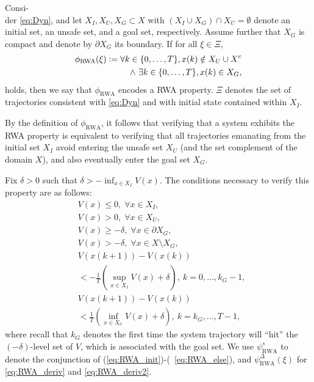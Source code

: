 \begin{property}\label{prop:rwa}
     Consi-\\der \eqref{eq:Dyn}, and let $X_I, X_U, X_G \subset X$ with $(X_I \cup X_G) \cap X_U = \emptyset$ denote an initial set, an unsafe set, and a goal set, respectively.
     Assume further that $X_G$ is compact and denote by $\partial X_G$ its boundary. 
     If for all $\xi \in \Xi$,
   \begin{equation*}
    \begin{aligned}
                \phi_\mathrm{RWA}(\xi) \vcentcolon= \forall k \in \{0,\dots,T\}, x(k) \notin X_U \cup X^c  \\ \wedge~\exists k \in \{0, \dots, T\}, x(k) \in X_G,
    \end{aligned}
    \end{equation*}
    holds, then we say that $\phi_\mathrm{RWA}$ encodes a RWA property.
    $\Xi$ denotes the set of trajectories consistent with \eqref{eq:Dyn} and with initial state contained within $X_I$.
\end{property}
By the definition of $\phi_\mathrm{RWA}$, it follows that verifying that a system exhibits the RWA property is equivalent to verifying that all trajectories emanating from the initial set $X_I$ avoid entering the unsafe set $X_U$ (and the set complement of the domain $X$), and also eventually enter the goal set $X_G$.

Fix $\delta>0$ such that $\delta > -\inf_{x \in X_I} V(x)$.  
The conditions necessary to verify this property are as follows: 
    \begin{align}
 \label{eq:RWA_init}
		&V(x) \leq 0, \; \forall x \in X_I,\\
  \label{eq:RWA_safe}
		&V(x) > 0, \; \forall x \in X_U,\\
  \label{eq:RWA_goal}
  &V(x) \geq -\delta, \; \forall x \in \partial X_G, \\
		&V(x) > -\delta, \; \forall x \in X \setminus X_G, 
  \label{eq:RWA_else}\\
		&V(x(k+1)) - V(x(k)) \label{eq:RWA_deriv} \\
        &<- \frac{1}{T}\left(\sup_{x \in X_I} V(x) +\delta \right),~ k=0,\dots,k_G-1,\nonumber\\
		&V(x(k+1)) - V(x(k)) \label{eq:RWA_deriv2} \\
        &< \frac{1}{T}\left(\inf_{x \in X_U} V(x) +\delta \right),~ k=k_G,\dots,T-1,\nonumber
    \end{align}
where recall that $k_G$ denotes the first time the system trajectory will ``hit'' the $(-\delta)$-level set of $V$, which is associated with the goal set. 
We use $\psi^s_\mathrm{RWA}$ to denote the conjunction of (\ref{eq:RWA_init})-(~\ref{eq:RWA_else}), and $\psi^\Delta_\mathrm{RWA}(\xi)$ for \eqref{eq:RWA_deriv} and \eqref{eq:RWA_deriv2}. 

